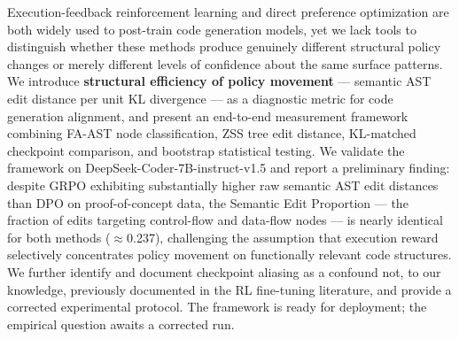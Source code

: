 Execution-feedback reinforcement learning and direct preference optimization are
both widely used to post-train code generation models, yet we lack tools to
distinguish whether these methods produce genuinely different structural policy
changes or merely different levels of confidence about the same surface patterns.
We introduce \textbf{structural efficiency of policy movement} --- semantic AST edit
distance per unit KL divergence --- as a diagnostic metric for code generation
alignment, and present an end-to-end measurement framework combining FA-AST
node classification, ZSS tree edit distance, KL-matched checkpoint comparison,
and bootstrap statistical testing. We validate the framework on
DeepSeek-Coder-7B-instruct-v1.5 and report a preliminary finding: despite GRPO
exhibiting substantially higher raw semantic AST edit distances than DPO on
proof-of-concept data, the Semantic Edit Proportion --- the fraction of edits
targeting control-flow and data-flow nodes --- is nearly identical for both methods
($\approx$0.237), challenging the assumption that execution reward selectively
concentrates policy movement on functionally relevant code structures. We further
identify and document checkpoint aliasing as a confound not, to our knowledge,
previously documented in the RL fine-tuning literature, and provide a corrected
experimental protocol.
The framework is ready for deployment; the empirical question awaits a corrected run.
